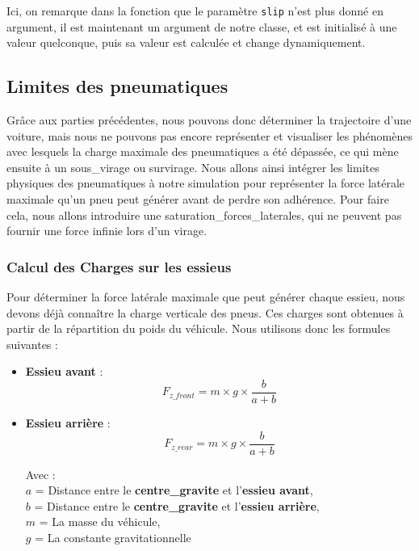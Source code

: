 Ici, on remarque dans la fonction que le paramètre \texttt{slip} n'est plus donné en argument, il est maintenant un argument de notre classe, et est initialisé à une valeur quelconque, puis sa valeur est calculée et change dynamiquement.

\subsection{Limites des pneumatiques}

Grâce aux parties précédentes, nous pouvons donc déterminer la trajectoire d'une voiture, mais nous ne pouvons pas encore représenter et visualiser les phénomènes avec lesquels la charge maximale des pneumatiques a été dépassée, ce qui mène ensuite à un \gls{sous_virage} ou \gls{survirage}.
Nous allons ainsi intégrer les limites physiques des pneumatiques à notre simulation pour représenter la force latérale maximale qu'un pneu peut générer avant de perdre son adhérence.
Pour faire cela, nous allons introduire une \gls{saturation_forces_laterales}, qui ne peuvent pas fournir une force infinie lors d'un virage.

\subsubsection{Calcul des Charges sur les \glspl{essieu}}

Pour déterminer la force latérale maximale que peut générer chaque \gls{essieu}, nous devons déjà connaître la charge verticale des pneus.
Ces charges sont obtenues à partir de la répartition du poids du véhicule.
Nous utilisons donc les formules suivantes :

\begin{itemize}
\item \textbf{Essieu avant} :
$$F_{z\_front} = m \times g \times \frac{b}{a+b}$$
\item \textbf{Essieu arrière} :
$$F_{z\_rear} = m \times g \times \frac{b}{a+b}$$

Avec :\\
$a$ = Distance entre le \textbf{\gls{centre_gravite}} et l'\textbf{\gls{essieu} avant},\\
$b$ = Distance entre le \textbf{\gls{centre_gravite}} et l'\textbf{\gls{essieu} arrière},\\
$m$ = La masse du véhicule, \\
$g$ = La constante gravitationnelle \\
\end{itemize}

